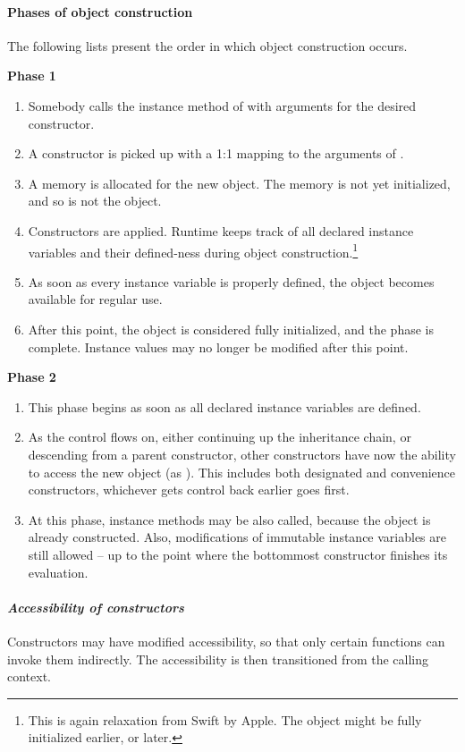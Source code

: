 \paragraph{Phases of object construction}
The following lists present the order in which object construction occurs.

{\bfseries Phase 1}
\begin{enumerate}
  \item Somebody calls the  instance method of  with arguments for the desired constructor. 
  \item A constructor is picked up with a 1:1 mapping to the arguments of . 
  \item A memory is allocated for the new object. The memory is not yet initialized, and so is not the object. 
  \item Constructors are applied. Runtime keeps track of all declared instance variables and their defined-ness during object construction.\footnote{This is again relaxation from Swift by Apple. The object might be fully initialized earlier, or later.} 
  \item As soon as every instance variable is properly defined, the  object becomes available for regular use. 
  \item After this point, the object is considered fully initialized, and the phase is complete. Instance values may no longer be modified after this point. 
\end{enumerate}

{\bfseries Phase 2}
\begin{enumerate}
  \item This phase begins as soon as all declared instance variables are defined.
  \item As the control flows on, either continuing up the inheritance chain, or descending from a parent constructor, other constructors have now the ability to access the new object (as ). This includes both designated and convenience constructors, whichever gets control back earlier goes first. 
  \item At this phase, instance methods may be also called, because the object is already constructed. Also, modifications of immutable instance variables are still allowed -- up to the point where the bottommost constructor finishes its evaluation. 
\end{enumerate}

\paragraph{\em Accessibility of constructors}
Constructors may have modified accessibility, so that only certain functions can invoke them indirectly. The accessibility is then transitioned from the calling context. 

